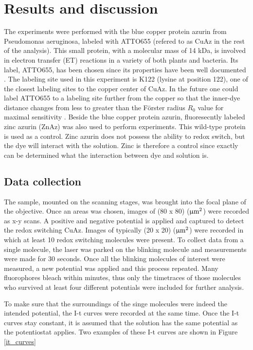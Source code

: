 \documentclass[twoside,single]{lion-msc}
\begin{document}
\chapter{Results and discussion}

The experiments were performed with the blue copper protein azurin from Pseudomonas aeruginosa, labeled with ATTO655 (refered to as CuAz in the rest of the analysis). This small protein, with a molecular mass of 14 kDa, is involved in electron transfer (ET) reactions in a variety of both plants and bacteria. Its label, ATTO655, has been chosen since its properties have been well documented \cite{pvd_11}. The labeling site used in this experiment is K122 (lysine at position 122), one of the closest labeling sites to the copper center of CuAz. In the future one could label ATTO655 to a labeling site further from the copper so that the inner-dye distance changes from less to greater than the F\"{o}rster radius $R_{0}$ value for maximal sensitivity \cite{Roy2008}. 
Beside the blue copper protein azurin, fluoresecntly labeled zinc azurin (ZnAz) was also used to perform experiments. This wild-type protein is used as a control. Zinc azurin does not possess the ability to redox switch, but the dye will interact with the solution. Zinc is therefore a control since exactly can be determined what the interaction between dye and solution is.

\section*{Data collection} \label{data_coll}
The sample, mounted on the scanning stages, was brought into the focal plane of the objective. Once an areas was chosen, images of (80 x 80) ($\upmu \textup{m}^{2}$) were recorded as x-y scans. A positive and negative potential is applied and captured to detect the redox switching CuAz. Images of typically (20 x 20) ($\upmu \textup{m}^{2}$) were recorded in which at least 10 redox switching molecules were present. To collect data from a single molecule, the laser was parked on the blinking molecule and measurements were made for 30 seconds. Once all the blinking molecules of interest were measured, a new potential was applied and this process repeated. Many fluorophores bleach within minutes, thus only the timetraces of those molecules who survived at least four different potentials were included for further analysis. 

To make sure that the surroundings of the singe molecules were indeed the intended potential, the I-t curves were recorded at the same time. Once the I-t curves stay constant, it is assumed that the solution has the same potential as the potentiostat applies. Two examples of these I-t curves are shown in Figure \ref{it_curves}
\end{document}
